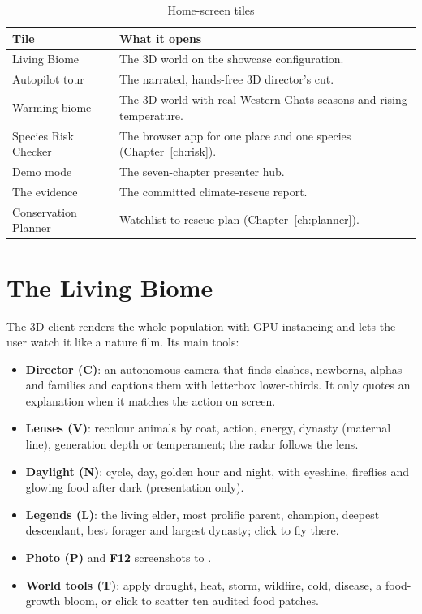 \begin{table}[htbp]
\centering
\caption{Home-screen tiles}
\begin{tabularx}{\textwidth}{lL}
\toprule
Tile & What it opens \\
\midrule
Living Biome & The 3D world on the showcase configuration. \\
Autopilot tour & The narrated, hands-free 3D director's cut. \\
Warming biome & The 3D world with real Western Ghats seasons and rising temperature. \\
Species Risk Checker & The browser app for one place and one species (Chapter~\ref{ch:risk}). \\
Demo mode & The seven-chapter presenter hub. \\
The evidence & The committed climate-rescue report. \\
Conservation Planner & Watchlist to rescue plan (Chapter~\ref{ch:planner}). \\
\bottomrule
\end{tabularx}
\end{table}

\section{The Living Biome}
The 3D client renders the whole population with GPU instancing and lets the user
watch it like a nature film. Its main tools:
\begin{itemize}[leftmargin=*]
\item \textbf{Director (C)}: an autonomous camera that finds clashes, newborns,
alphas and families and captions them with letterbox lower-thirds. It only quotes
an explanation when it matches the action on screen.
\item \textbf{Lenses (V)}: recolour animals by coat, action, energy, dynasty
(maternal line), generation depth or temperament; the radar follows the lens.
\item \textbf{Daylight (N)}: cycle, day, golden hour and night, with eyeshine,
fireflies and glowing food after dark (presentation only).
\item \textbf{Legends (L)}: the living elder, most prolific parent, champion,
deepest descendant, best forager and largest dynasty; click to fly there.
\item \textbf{Photo (P)} and \textbf{F12} screenshots to .
\item \textbf{World tools (T)}: apply drought, heat, storm, wildfire, cold,
disease, a food-growth bloom, or click to scatter ten audited food patches.
\end{itemize}

